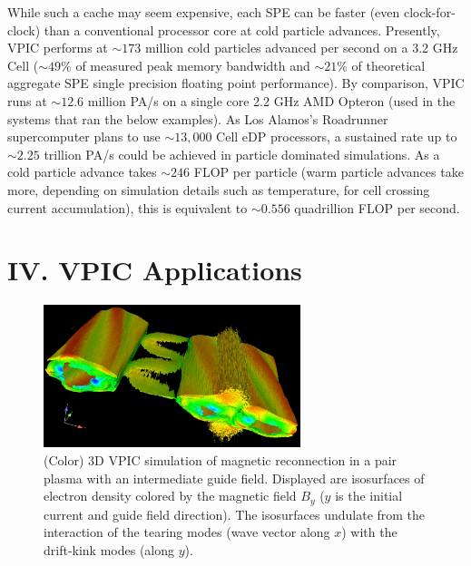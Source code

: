 \documentclass[aps,prl,preprint,preprintnumbers,groupedaddress]{revtex4}
\begin{document}
While such a cache may seem expensive, each SPE can be faster (even
clock-for-clock) than a conventional processor core at cold particle
advances.  Presently, VPIC performs at $\sim 173$ million cold
particles advanced per second on a 3.2 GHz Cell ($\sim 49\%$ of
measured peak memory bandwidth and $\sim 21\%$ of theoretical
aggregate SPE single precision floating point performance).  By
comparison, VPIC runs at $\sim 12.6$ million PA/s on a single core 2.2
GHz AMD Opteron (used in the systems that ran the below examples).  As
Los Alamos's Roadrunner supercomputer plans to use $\sim 13,000$ Cell
eDP processors, a sustained rate up to $\sim 2.25$ trillion PA/s could
be achieved in particle dominated simulations.  As a cold particle
advance takes $\sim 246$ FLOP per particle (warm particle advances
take more, depending on simulation details such as temperature, for
cell crossing current accumulation), this is equivalent to $\sim
0.556$ quadrillion FLOP per second.

\section{IV. VPIC Applications}

\begin{figure}
\centering
\includegraphics[width=75mm]{magnetic_reconnection.eps}
\caption{\label{fig:magnetic_reconnection}
(Color) 3D VPIC simulation of magnetic reconnection in a pair plasma
with an intermediate guide field.  Displayed are isosurfaces of
electron density colored by the magnetic field $B_y$ ($y$ is the
initial current and guide field direction).  The isosurfaces undulate
from the interaction of the tearing modes (wave vector along $x$) with
the drift-kink modes (along $y$). \cite{Yin_et_al_PRL_2007_reconnection}}
\end{figure}
\end{document}
